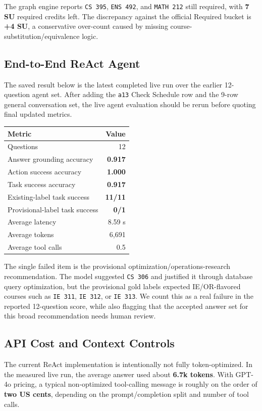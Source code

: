 \documentclass[10pt,letterpaper]{article}
\newcommand{\code}[1]{\texttt{#1}}
\begin{document}
The graph engine reports \code{CS 395}, \code{ENS 492}, and \code{MATH 212} still required, with \textbf{7 SU} required credits left. The discrepancy against the official Required bucket is \textbf{+4 SU}, a conservative over-count caused by missing course-substitution/equivalence logic.

\subsection{End-to-End ReAct Agent}

The saved result below is the latest completed live run over the earlier 12-question agent set. After adding the \code{a13} Check Schedule row and the 9-row general conversation set, the live agent evaluation should be rerun before quoting final updated metrics.

\begin{table}[h]
\centering
\small
\begin{tabularx}{0.75\linewidth}{@{}Yr@{}}
\toprule
\textbf{Metric} & \textbf{Value} \\
\midrule
Questions & 12 \\
Answer grounding accuracy & \textbf{0.917} \\
Action success accuracy & \textbf{1.000} \\
Task success accuracy & \textbf{0.917} \\
Existing-label task success & \textbf{11/11} \\
Provisional-label task success & \textbf{0/1} \\
Average latency & 8.59 s \\
Average tokens & 6,691 \\
Average tool calls & 0.5 \\
\bottomrule
\end{tabularx}
\end{table}

The single failed item is the provisional optimization/operations-research recommendation. The model suggested \code{CS 306} and justified it through database query optimization, but the provisional gold labels expected IE/OR-flavored courses such as \code{IE 311}, \code{IE 312}, or \code{IE 313}. We count this as a real failure in the reported 12-question score, while also flagging that the accepted answer set for this broad recommendation needs human review.

\subsection{API Cost and Context Controls}
The current ReAct implementation is intentionally not fully token-optimized. In the measured live run, the average answer used about \textbf{6.7k tokens}. With GPT-4o pricing, a typical non-optimized tool-calling message is roughly on the order of \textbf{two US cents}, depending on the prompt/completion split and number of tool calls.
\end{document}
